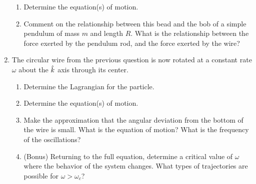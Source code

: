 \documentclass[../psets.tex]{subfiles}
\begin{document}
\begin{enumerate}
\begin{enumerate}
        \item Determine the equation(s) of motion.
        \item Comment on the relationship between this bead and the bob of a simple pendulum of mass $m$ and length $R$. What is the relationship between the force exerted by the pendulum rod, and the force exerted by the wire?
    \end{enumerate}
    \item The circular wire from the previous question is now rotated at a constant rate $\omega$ about the $\hat{k}$ axis through its center.
    \begin{enumerate}
        \item Determine the Lagrangian for the particle.
        \item Determine the equation(s) of motion.
        \item Make the approximation that the angular deviation from the bottom of the wire is small. What is the equation of motion? What is the frequency of the oscillations?
        \item (Bonus) Returning to the full equation, determine a critical value of $\omega$ where the behavior of the system changes. What types of trajectories are possible for $\omega>\omega_c$?
    \end{enumerate}
\end{enumerate}
\end{document}
